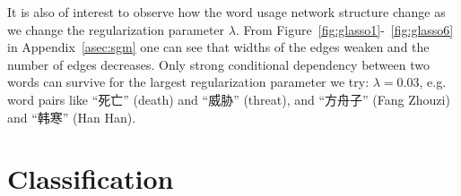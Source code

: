 \documentclass[11pt]{article}
\newcommand{\1}[1]{{\mathbf 1}\left\{#1\right\}}        %
\begin{document}
It is also of interest to observe how the word usage network structure change as we change the regularization parameter $\lambda$. From Figure~\ref{fig:glasso1}-~\ref{fig:glasso6} in Appendix~\ref{asec:sgm} one can see that widths of the edges weaken and the number of edges decreases. Only strong conditional dependency between two words can survive for the largest regularization parameter we try: $\lambda = 0.03$, e.g. word pairs like ``死亡'' (death) and ``威胁'' (threat), and ``方舟子'' (Fang Zhouzi) and ``韩寒'' (Han Han).  





\section{Classification}
\end{document}
